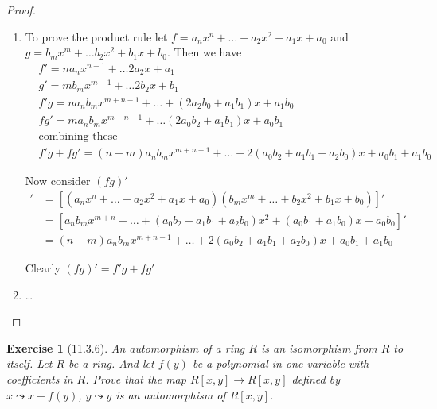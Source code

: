 \documentclass[12pt]{article}
\newtheorem*{exer}{Exercise}
\begin{document}
\begin{proof}
    \begin{enumerate}
        \item To prove the product rule let $f = a_n x^n + \dots + a_2
            x^2 + a_1 x + a_0$ and $g = b_m x^m + \dots b_2 x^2 + b_1 x
            + b_0$. Then we have
            \begin{align*}
                & f' = n a_n x^{n - 1} + \dots 2 a_2 x + a_1 \\
                & g' = m b_m x^{m - 1} + \dots 2 b_2 x + b_1 \\
                & f'g = n a_n b_m x^{m + n -1} + \dots + (2 a_2 b_0 +
                a_1 b_1)x + a_1 b_0 \\
                & fg' = m a_n b_m x^{m + n - 1} + \dots (2 a_0 b_2 + a_1
                b_1)x + a_0 b_1 \\
                & \text{combining these} \\
                & f'g + fg' = (n + m) a_n b_m x^{m + n - 1} + \dots +
                2(a_0 b_2 + a_1 b_1 + a_2 b_0)x + a_0 b_1 + a_1 b_0
            \end{align*}

            Now consider $(fg)'$
            \begin{align*}
                [fg]' &= [(a_n x^n + \dots + a_2 x^2 + a_1 x +
                a_0)(b_m x^m + \dots + b_2 x^2 + b_1 x + b_0)]'\\
                &= [a_n b_m x^{m + n} + \dots + (a_0 b_2 + a_1 b_1 + a_2
                b_0)x^2 + (a_0 b_1 + a_1 b_0)x + a_0 b_0]'\\
                &= (n + m) a_n b_m x^{m + n - 1} + \dots + 2(a_0 b_2 +
                a_1 b_1 + a_2 b_0)x + a_0 b_1 + a_1 b_0
            \end{align*}

            Clearly $(fg)' = f'g + fg'$

        \item \dots

    \end{enumerate}
\end{proof}


\begin{exer}[11.3.6]

    An \textit{automorphism} of a ring $R$ is an isomorphism from $R$ to
    itself. Let $R$ be a ring. And let $f(y)$ be a polynomial in one
    variable with coefficients in $R$. Prove that the map $R[x, y]
    \rightarrow R[x, y]$ defined by $x \leadsto x + f(y)$, $y \leadsto
    y$ is an automorphism of $R[x, y]$.

\end{exer}
\end{document}
